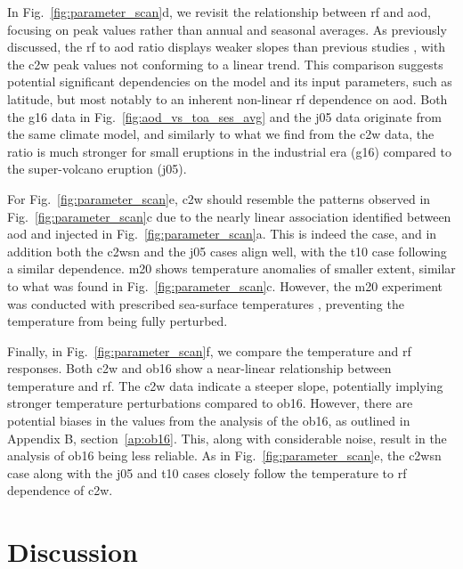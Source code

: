 \documentclass{ametsocV6.1}
\newcommand{\iso}[1][i]{{#1}njected \ce{SO2}}
\begin{document}
In Fig.~\ref{fig:parameter_scan}d, we revisit the relationship between \gls{rf}
and \gls{aod}, focusing on peak values rather than annual and seasonal averages. As
previously discussed, the \gls{rf} to \gls{aod} ratio displays weaker slopes than
previous studies \citep{jones2005, marshall2020, timmreck2010}, with the \gls{c2w} peak
values not conforming to a linear trend. This comparison suggests potential significant
dependencies on the model and its input parameters, such as latitude, but most notably
to an inherent non-linear \gls{rf} dependence on \gls{aod}. Both the \gls{g16} data in Fig.~\ref{fig:aod_vs_toa_ses_avg} and the
\gls{j05} data originate from the same climate model, and similarly to what we find from
the \gls{c2w} data, the ratio is much stronger for small eruptions in the industrial era
(\gls{g16}) compared to the super-volcano eruption (\gls{j05}).

For Fig.~\ref{fig:parameter_scan}e, \gls{c2w} should resemble the patterns observed in
Fig.~\ref{fig:parameter_scan}c due to the nearly linear association identified between
\gls{aod} and \iso{} in Fig.~\ref{fig:parameter_scan}a. This is indeed the case, and in
addition both the \gls{c2wsn} and the \gls{j05} cases align well, with the \gls{t10}
case following a similar dependence. \gls{m20} shows temperature anomalies of smaller
extent, similar to what was found in Fig.~\ref{fig:parameter_scan}c. However, the
\gls{m20} experiment was conducted with prescribed sea-surface temperatures
\citep{marshall2020}, preventing the temperature from being fully perturbed.

Finally, in Fig.~\ref{fig:parameter_scan}f, we compare the temperature and \gls{rf}
responses. Both \gls{c2w} and \gls{ob16} show a near-linear relationship between
temperature and \gls{rf}. The \gls{c2w} data indicate a steeper slope, potentially
implying stronger temperature perturbations compared to \gls{ob16}. However, there are
potential biases in the values from the analysis of the \gls{ob16}, as outlined in
Appendix B, section~\ref{ap:ob16}. This, along with considerable noise, result in the
analysis of \gls{ob16} being less reliable. As in Fig.~\ref{fig:parameter_scan}e, the
\gls{c2wsn} case along with the \gls{j05} and \gls{t10} cases closely follow the
temperature to \gls{rf} dependence of \gls{c2w}.

\section{Discussion}\label{sec:discussion}
\end{document}
